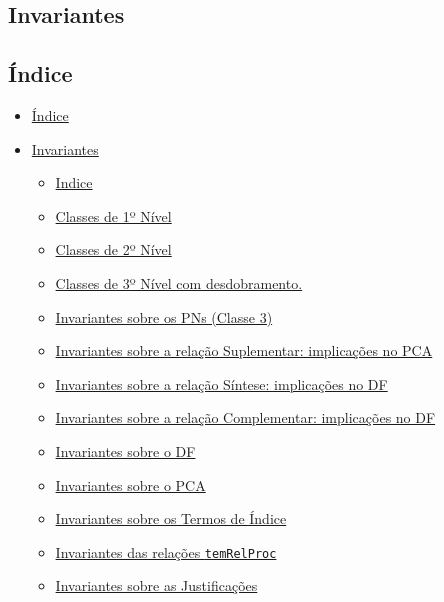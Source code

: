 \documentclass[tikz,runningheads,a4paper]{llncs}
\begin{document}
\begin{subappendices}
\renewcommand{\thesection}{\Alph{section}}%

\section{Invariantes}

\hypertarget{uxedndice}{%
\subsection{Índice}\label{uxedndice}}

\begin{itemize}
\tightlist
\item
  \protect\hyperlink{ux5cux25C3ux5cux25ADndice}{Índice}
\item
  \protect\hyperlink{invariantes}{Invariantes}

  \begin{itemize}
  \tightlist
  \item
    \protect\hyperlink{indice}{Indice}
  \item
    \protect\hyperlink{classes-de-1-nivel}{Classes
    de 1º Nível}
  \item
    \protect\hyperlink{classes-de-2-nivel}{Classes
    de 2º Nível}
  \item
    \protect\hyperlink{classes-de-3-nivel-com-desdobramento}{Classes
    de 3º Nível com desdobramento.}
  \item
    \protect\hyperlink{invariantes-sobre-os-pns-classe-3}{Invariantes
    sobre os PNs (Classe 3)}
  \item
    \protect\hyperlink{invariantes-sobre-a-relacaoo-suplementar-implicacoes-no-pca}{Invariantes
    sobre a relação Suplementar: implicações no PCA}
  \item
    \protect\hyperlink{invariantes-sobre-a-relacao-sintese-implicacoes-no-df}{Invariantes
    sobre a relação Síntese: implicações no DF}
  \item
    \protect\hyperlink{invariantes-sobre-a-relacao-complementar-implicacoes-no-df}{Invariantes
    sobre a relação Complementar: implicações no DF}
  \item
    \protect\hyperlink{invariantes-sobre-o-df}{Invariantes sobre o DF}
  \item
    \protect\hyperlink{invariantes-sobre-o-pca}{Invariantes sobre o PCA}
  \item
    \protect\hyperlink{invariantes-sobre-os-termos-de-indice}{Invariantes
    sobre os Termos de Índice}
  \item
    \protect\hyperlink{invariantes-das-relacoes-temrelproc}{Invariantes
    das relações \texttt{temRelProc}}
  \item
    \protect\hyperlink{invariantes-sobre-as-justificacoes}{Invariantes
    sobre as Justificações}
  \end{itemize}
\end{itemize}


\end{subappendices}
\end{document}
